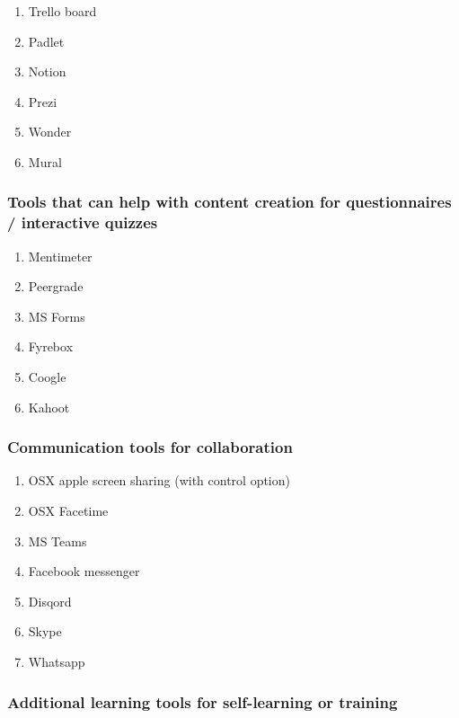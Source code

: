 \documentclass[
]{book}
\providecommand{\tightlist}{%
  \setlength{\itemsep}{0pt}\setlength{\parskip}{0pt}}
\begin{document}
\begin{enumerate}
\def\labelenumi{\arabic{enumi}.}
\tightlist
\item
  Trello board
\item
  Padlet
\item
  Notion
\item
  Prezi
\item
  Wonder
\item
  Mural
\end{enumerate}

\hypertarget{tools-that-can-help-with-content-creation-for-questionnaires-interactive-quizzes}{%
\subsubsection{Tools that can help with content creation for questionnaires / interactive quizzes}\label{tools-that-can-help-with-content-creation-for-questionnaires-interactive-quizzes}}

\begin{enumerate}
\def\labelenumi{\arabic{enumi}.}
\tightlist
\item
  Mentimeter
\item
  Peergrade
\item
  MS Forms
\item
  Fyrebox
\item
  Coogle
\item
  Kahoot
\end{enumerate}

\hypertarget{communication-tools-for-collaboration}{%
\subsubsection{Communication tools for collaboration}\label{communication-tools-for-collaboration}}

\begin{enumerate}
\def\labelenumi{\arabic{enumi}.}
\tightlist
\item
  OSX apple screen sharing (with control option)
\item
  OSX Facetime
\item
  MS Teams
\item
  Facebook messenger
\item
  Disqord
\item
  Skype
\item
  Whatsapp
\end{enumerate}

\hypertarget{additional-learning-tools-for-self-learning-or-training}{%
\subsubsection{Additional learning tools for self-learning or training}\label{additional-learning-tools-for-self-learning-or-training}}
\end{document}

